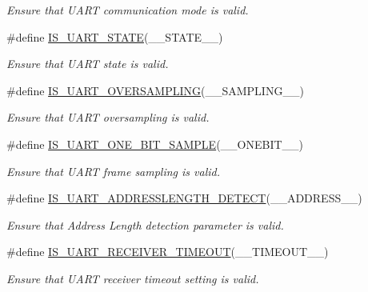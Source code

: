 \begin{DoxyCompactItemize}
\begin{DoxyCompactList}\small\item\em Ensure that U\+A\+RT communication mode is valid. \end{DoxyCompactList}\item 
\#define \hyperlink{group___u_a_r_t___private___macros_ga754855879401ab846803a03eec2f7f10}{I\+S\+\_\+\+U\+A\+R\+T\+\_\+\+S\+T\+A\+TE}(\+\_\+\+\_\+\+S\+T\+A\+T\+E\+\_\+\+\_\+)
\begin{DoxyCompactList}\small\item\em Ensure that U\+A\+RT state is valid. \end{DoxyCompactList}\item 
\#define \hyperlink{group___u_a_r_t___private___macros_ga8d918253e015c4a8aa07316a89f8265e}{I\+S\+\_\+\+U\+A\+R\+T\+\_\+\+O\+V\+E\+R\+S\+A\+M\+P\+L\+I\+NG}(\+\_\+\+\_\+\+S\+A\+M\+P\+L\+I\+N\+G\+\_\+\+\_\+)
\begin{DoxyCompactList}\small\item\em Ensure that U\+A\+RT oversampling is valid. \end{DoxyCompactList}\item 
\#define \hyperlink{group___u_a_r_t___private___macros_ga6452a4420dac4abd4f0ea0e1677f37a9}{I\+S\+\_\+\+U\+A\+R\+T\+\_\+\+O\+N\+E\+\_\+\+B\+I\+T\+\_\+\+S\+A\+M\+P\+LE}(\+\_\+\+\_\+\+O\+N\+E\+B\+I\+T\+\_\+\+\_\+)
\begin{DoxyCompactList}\small\item\em Ensure that U\+A\+RT frame sampling is valid. \end{DoxyCompactList}\item 
\#define \hyperlink{group___u_a_r_t___private___macros_gaa4cf2a15ad7ae46e2905debeef35a908}{I\+S\+\_\+\+U\+A\+R\+T\+\_\+\+A\+D\+D\+R\+E\+S\+S\+L\+E\+N\+G\+T\+H\+\_\+\+D\+E\+T\+E\+CT}(\+\_\+\+\_\+\+A\+D\+D\+R\+E\+S\+S\+\_\+\+\_\+)
\begin{DoxyCompactList}\small\item\em Ensure that Address Length detection parameter is valid. \end{DoxyCompactList}\item 
\#define \hyperlink{group___u_a_r_t___private___macros_gaa2ad21da17caf46375c7bd4efbde8b17}{I\+S\+\_\+\+U\+A\+R\+T\+\_\+\+R\+E\+C\+E\+I\+V\+E\+R\+\_\+\+T\+I\+M\+E\+O\+UT}(\+\_\+\+\_\+\+T\+I\+M\+E\+O\+U\+T\+\_\+\+\_\+)
\begin{DoxyCompactList}\small\item\em Ensure that U\+A\+RT receiver timeout setting is valid. \end{DoxyCompactList}\item 

\end{DoxyCompactItemize}
